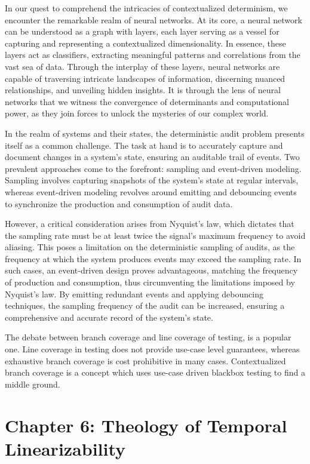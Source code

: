 \documentclass[ebook,12pt,oneside,openany]{memoir}
\begin{document}
\indent In our quest to comprehend the intricacies of contextualized determinism, we encounter the remarkable realm of neural networks. At its core, a neural network can be understood as a graph with layers, each layer serving as a vessel for capturing and representing a contextualized dimensionality. In essence, these layers act as classifiers, extracting meaningful patterns and correlations from the vast sea of data. Through the interplay of these layers, neural networks are capable of traversing intricate landscapes of information, discerning nuanced relationships, and unveiling hidden insights. It is through the lens of neural networks that we witness the convergence of determinants and computational power, as they join forces to unlock the mysteries of our complex world.

\indent In the realm of systems and their states, the deterministic audit problem presents itself as a common challenge. The task at hand is to accurately capture and document changes in a system's state, ensuring an auditable trail of events. Two prevalent approaches come to the forefront: sampling and event-driven modeling. Sampling involves capturing snapshots of the system's state at regular intervals, whereas event-driven modeling revolves around emitting and debouncing events to synchronize the production and consumption of audit data.

\indent However, a critical consideration arises from Nyquist's law, which dictates that the sampling rate must be at least twice the signal's maximum frequency to avoid aliasing. This poses a limitation on the deterministic sampling of audits, as the frequency at which the system produces events may exceed the sampling rate. In such cases, an event-driven design proves advantageous, matching the frequency of production and consumption, thus circumventing the limitations imposed by Nyquist's law. By emitting redundant events and applying debouncing techniques, the sampling frequency of the audit can be increased, ensuring a comprehensive and accurate record of the system's state.

\indent The debate between branch coverage and line coverage of testing, is a popular one. Line coverage in testing does not provide use-case level guarantees, whereas exhaustive branch coverage is cost prohibitive in many cases. Contextualized branch coverage is a concept which uses use-case driven blackbox testing to find a middle ground.
\chapter*{Chapter 6: Theology of Temporal Linearizability}
\end{document}
